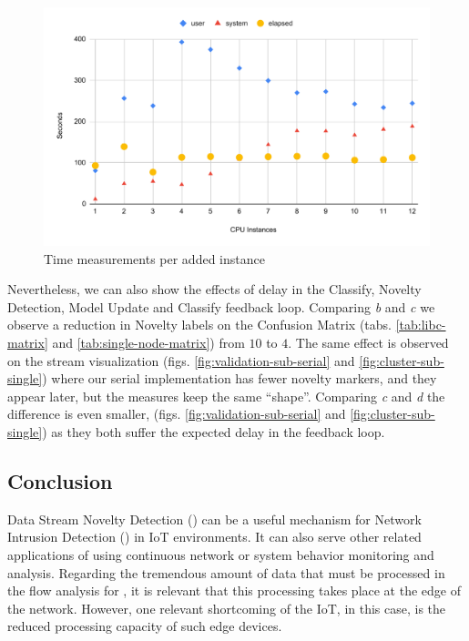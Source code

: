 \begin{figure}[hbt]
  \centering
  \includegraphics[width=\linewidth,page=1]{experiments/speedup-clean.pdf}
  \caption{Time measurements per added instance}
  \label{fig:speedup}
\end{figure}

Nevertheless, we can also show the effects of delay in the
Classify, Novelty Detection, Model Update and Classify feedback loop.
Comparing \emph{b} and \emph{c} we observe a reduction in Novelty labels
on the Confusion Matrix (tabs. \ref{tab:libc-matrix} and \ref{tab:single-node-matrix})
from $10$ to $4$.
The same effect is observed on the stream visualization (figs.
\ref{fig:validation-sub-serial} and \ref{fig:cluster-sub-single}) where our
serial implementation has fewer novelty markers, and they appear later, but the
measures keep the same ``shape''.
Comparing \emph{c} and \emph{d} the difference is even smaller,
(figs. \ref{fig:validation-sub-serial} and \ref{fig:cluster-sub-single})
as they both suffer the expected delay in the feedback loop.

\subsection{Conclusion}
\label{sec:conclusion}

Data Stream Novelty Detection (\nd) can be a useful mechanism for Network
Intrusion Detection (\nids) in IoT environments. It can also serve other related applications of \nd using continuous
network or system behavior monitoring and analysis.
Regarding the tremendous amount of data that must be processed in the flow analysis for \nd, it 
is relevant that this processing takes place at the edge of the network. 
However, one relevant shortcoming of the IoT, in this case, is the reduced processing capacity of such edge devices. 


